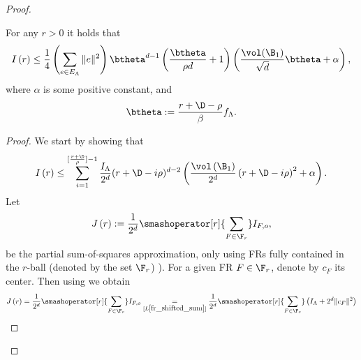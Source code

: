 \begin{proof}
\begin{thm}
For any $r>0$ it holds that
\begin{align*}
        I\left(r\right) \leq \frac{1}{4}\left(\sum_{e\in E_\Lambda}\|e\|^2\right) \btheta^{d-1}\left(\frac{\btheta}{\rho d}+1\right)\left(\frac{\vol(\B_1)}{\sqrt{d}}\btheta+ \alpha\right), 
    \end{align*}
    where $\alpha$ is some positive constant, and
    \[
        \btheta:=\frac{r+\D-\rho}{\beta}f_\Lambda.
    \]
 
\end{thm}
\begin{proof}
  We start by showing that
    \begin{align}
        I\left(r\right)\leq \sum_{i=1}^{[\frac{r+\D}{\rho}]-1} \frac{I_\Lambda}{2^d}(r+\D-i\rho)^{d-2}\left(\frac{ \vol\left(\B_1\right)}{2^d}\left(r+\D-i\rho\right)^2+\alpha\right).
    \end{align}
    Let
    \begin{align*}
        J\left(r\right):=\frac{1}{2^d}\smashoperator[r]{\sum_{F\in \F_r}} I_{F,o},
    \end{align*}
     be the partial sum-of-squares approximation, only using FRs fully contained in the $r$-ball (denoted by the set $\F_r$) ).
     For a given FR $F\in \F_r$, denote by $c_F$ its center.
     Then using  we obtain   \begin{align*}
        J\left(r\right)&= \frac{1}{2^d}\smashoperator[r]{\sum_{F\in \F_r}} I_{F,o} \underset{[L\ref{fr_shifted_sum}]}{=} \frac{1}{2^d}\smashoperator[r]{\sum_{F\in \F_r}} \left(I_\Lambda + 2^d\|c_F\|^2\right)\\

\end{align*}
\end{proof}
\end{proof}
